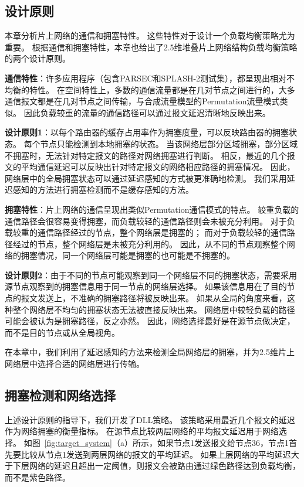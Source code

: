 \subsection{设计原则}

本章分析片上网络的通信和拥塞特性。
这些特性对于设计一个负载均衡策略尤为重要。
根据通信和拥塞特性，本章也给出了2.5维堆叠片上网络结构负载均衡策略的两个设计原则。

\textbf{通信特性}：许多应用程序（包含PARSEC和SPLASH-2测试集），都呈现出相对不均衡的特性。
在空间特性上，多数的通信流量都是在几对节点之间进行的，大多通信报文都是在几对节点之间传输，与合成流量模型的Permutation流量模式类似。
因此负载较重的流量的通信路径可以通过报文延迟清晰地反映出来。

\textbf{设计原则1}：以每个路由器的缓存占用率作为拥塞度量，可以反映路由器的拥塞状态。
每个节点只能检测到本地拥塞的状态。
当该网络层部分区域拥塞，部分区域不拥塞时，无法针对特定报文的路径对网络拥塞进行判断。
相反，最近的几个报文的平均通信延迟可以反映出针对特定报文的网络相应路径的拥塞情况。
因此，网络层中的全局拥塞状态可以通过延迟感知的方式被更准确地检测。
我们采用延迟感知的方法进行拥塞检测而不是缓存感知的方法。

\textbf{拥塞特性}：片上网络的通信呈现出类似Permutation通信模式的特点。
较重负载的通信路径会很容易变得拥塞，而负载较轻的通信路径则会未被充分利用。
对于负载较重的通信路径经过的节点，整个网络层是拥塞的；
而对于负载较轻的通信路径经过的节点，整个网络层是未被充分利用的。
因此，从不同的节点观察整个网络的拥塞情况，同一个网络层可能是拥塞的也可能是不拥塞的。

\textbf{设计原则2}：由于不同的节点可能观察到同一个网络层不同的拥塞状态，需要采用源节点观察到的拥塞信息用于同一节点的网络层选择。
如果该信息用在了目的节点的报文发送上，不准确的拥塞路径将被反映出来。
如果从全局的角度来看，这种整个网络层不均匀的拥塞状态无法被直接反映出来。
网络层中较轻负载的路径可能会被认为是拥塞路径，反之亦然。
因此，网络选择最好是在源节点做决定，而不是目的节点或从全局视角。

在本章中，我们利用了延迟感知的方法来检测全局网络层的拥塞，并为2.5维片上网络层中选择合适的网络层进行传输。

\subsection{拥塞检测和网络选择}

上述设计原则的指导下，我们开发了DLL策略。
该策略采用最近几个报文的延迟作为网络拥塞的衡量指标。
在源节点比较两层网络的平均报文延迟用于网络选择。
如图~\ref{fig:target_system}（a）所示，如果节点1发送报文给节点36，节点1首先要比较从节点1发送到两层网络的报文的平均延迟。
如果上层网络的平均延迟大于下层网络的延迟且超出一定阈值，则报文会被路由通过绿色路径达到负载均衡，而不是紫色路径。

